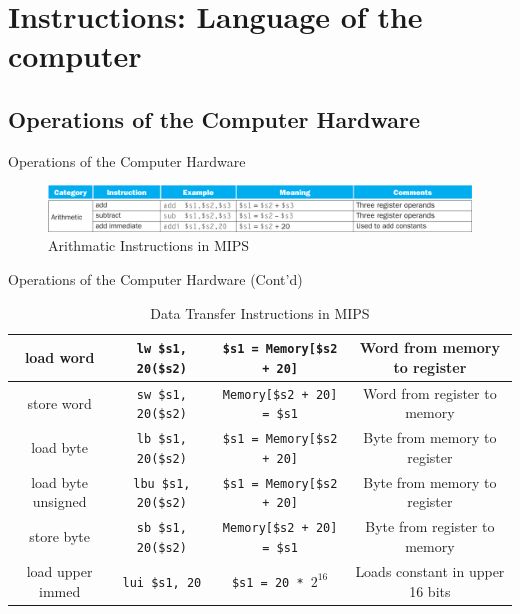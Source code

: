 \section{Instructions: Language of the computer}
\subsection{Operations of the Computer Hardware}
\begin{frame}{Operations of the Computer Hardware}
\begin{figure}\caption{Arithmatic Instructions in MIPS}
\begin{center}
\includegraphics[width=\textwidth, height=0.2\textheight]{docs/images/operations-1}
\end{center}
\end{figure}
\end{frame}

\begin{frame}{Operations of the Computer Hardware (Cont'd)}
\begin{table}[H]
\begin{adjustbox}{width=\textwidth}
\begin{tabular}{|c|c|c|c|}
\hline
load word & \texttt{lw \$s1, 20(\$s2)} & \texttt{\$s1 = Memory[\$s2 + 20]} & Word from memory to register \\
\hline
store word & \texttt{sw \$s1, 20(\$s2)} & \texttt{Memory[\$s2 + 20] = \$s1} & Word from register to memory \\
\hline
load byte & \texttt{lb \$s1, 20(\$s2)} & \texttt{\$s1 = Memory[\$s2 + 20]} & Byte from memory to register \\
\hline
load byte unsigned & \texttt{lbu \$s1, 20(\$s2)} & \texttt{\$s1 = Memory[\$s2 + 20]} & Byte from memory to register \\
\hline
store byte & \texttt{sb \$s1, 20(\$s2)} & \texttt{Memory[\$s2 + 20] = \$s1} & Byte from register to memory \\
\hline
load upper immed & \texttt{lui \$s1, 20} & \texttt{\$s1 = 20 * $2^{16}$} & Loads constant in upper 16 bits \\
\hline
\end{tabular}
\end{adjustbox}
\caption{Data Transfer Instructions in MIPS}
\end{table}
\end{frame}

